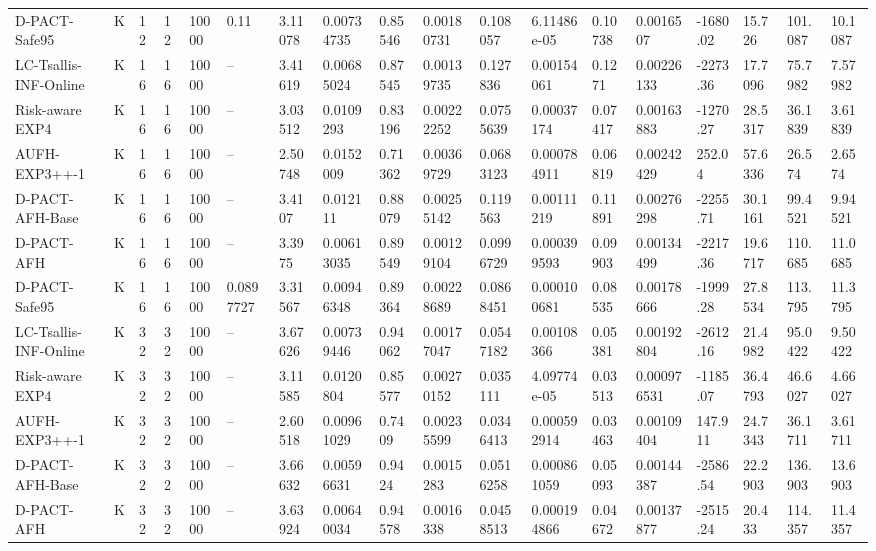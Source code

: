 \begin{tabular}{llllllllllllllllll}
D-PACT-Safe95 & K & 12 & 12 & 10000 & 0.11 & 3.11078 & 0.00734735 & 0.85546 & 0.00180731 & 0.108057 & 6.11486e-05 & 0.10738 & 0.0016507 & -1680.02 & 15.726 & 101.087 & 10.1087 \\ 
LC-Tsallis-INF-Online & K & 16 & 16 & 10000 & -- & 3.41619 & 0.00685024 & 0.87545 & 0.00139735 & 0.127836 & 0.00154061 & 0.1271 & 0.00226133 & -2273.36 & 17.7096 & 75.7982 & 7.57982 \\ 
Risk-aware EXP4 & K & 16 & 16 & 10000 & -- & 3.03512 & 0.0109293 & 0.83196 & 0.00222252 & 0.0755639 & 0.00037174 & 0.07417 & 0.00163883 & -1270.27 & 28.5317 & 36.1839 & 3.61839 \\ 
AUFH-EXP3++-1 & K & 16 & 16 & 10000 & -- & 2.50748 & 0.0152009 & 0.71362 & 0.00369729 & 0.0683123 & 0.000784911 & 0.06819 & 0.00242429 & 252.04 & 57.6336 & 26.574 & 2.6574 \\ 
D-PACT-AFH-Base & K & 16 & 16 & 10000 & -- & 3.4107 & 0.012111 & 0.88079 & 0.00255142 & 0.119563 & 0.00111219 & 0.11891 & 0.00276298 & -2255.71 & 30.1161 & 99.4521 & 9.94521 \\ 
D-PACT-AFH & K & 16 & 16 & 10000 & -- & 3.3975 & 0.00613035 & 0.89549 & 0.00129104 & 0.0996729 & 0.000399593 & 0.09903 & 0.00134499 & -2217.36 & 19.6717 & 110.685 & 11.0685 \\ 
D-PACT-Safe95 & K & 16 & 16 & 10000 & 0.0897727 & 3.31567 & 0.00946348 & 0.89364 & 0.00228689 & 0.0868451 & 0.000100681 & 0.08535 & 0.00178666 & -1999.28 & 27.8534 & 113.795 & 11.3795 \\ 
LC-Tsallis-INF-Online & K & 32 & 32 & 10000 & -- & 3.67626 & 0.00739446 & 0.94062 & 0.00177047 & 0.0547182 & 0.00108366 & 0.05381 & 0.00192804 & -2612.16 & 21.4982 & 95.0422 & 9.50422 \\ 
Risk-aware EXP4 & K & 32 & 32 & 10000 & -- & 3.11585 & 0.0120804 & 0.85577 & 0.00270152 & 0.035111 & 4.09774e-05 & 0.03513 & 0.000976531 & -1185.07 & 36.4793 & 46.6027 & 4.66027 \\ 
AUFH-EXP3++-1 & K & 32 & 32 & 10000 & -- & 2.60518 & 0.00961029 & 0.7409 & 0.00235599 & 0.0346413 & 0.000592914 & 0.03463 & 0.00109404 & 147.911 & 24.7343 & 36.1711 & 3.61711 \\ 
D-PACT-AFH-Base & K & 32 & 32 & 10000 & -- & 3.66632 & 0.00596631 & 0.9424 & 0.0015283 & 0.0516258 & 0.000861059 & 0.05093 & 0.00144387 & -2586.54 & 22.2903 & 136.903 & 13.6903 \\ 
D-PACT-AFH & K & 32 & 32 & 10000 & -- & 3.63924 & 0.00640034 & 0.94578 & 0.0016338 & 0.0458513 & 0.000194866 & 0.04672 & 0.00137877 & -2515.24 & 20.433 & 114.357 & 11.4357 \\ 

\end{tabular}

